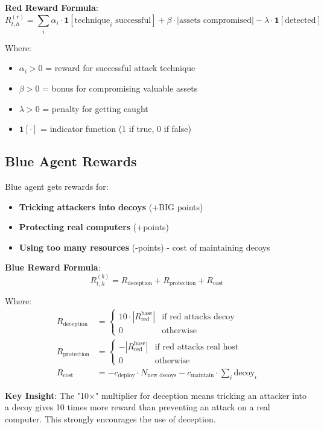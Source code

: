 \documentclass[11pt]{article}
\begin{document}
\begin{mathdetails}
\textbf{Red Reward Formula}:
$$R^{(r)}_{t,h} = \sum_i \alpha_i \cdot \mathbf{1}[\text{technique}_i \text{ successful}] + \beta \cdot |\text{assets compromised}| - \lambda \cdot \mathbf{1}[\text{detected}]$$

Where:
\begin{itemize}
\item $\alpha_i > 0$ = reward for successful attack technique
\item $\beta > 0$ = bonus for compromising valuable assets
\item $\lambda > 0$ = penalty for getting caught
\item $\mathbf{1}[\cdot]$ = indicator function (1 if true, 0 if false)
\end{itemize}
\end{mathdetails}

\subsection{Blue Agent Rewards}

\begin{intuition}
Blue agent gets rewards for:
\begin{itemize}
\item \textbf{Tricking attackers into decoys} (+BIG points)
\item \textbf{Protecting real computers} (+points)
\item \textbf{Using too many resources} (-points) - cost of maintaining decoys
\end{itemize}
\end{intuition}

\begin{mathdetails}
\textbf{Blue Reward Formula}:
$$R^{(b)}_{t,h} = R_{\text{deception}} + R_{\text{protection}} + R_{\text{cost}}$$

Where:
\begin{align}
R_{\text{deception}} &= \begin{cases}
10 \cdot |R_{\text{red}}^{\text{base}}| & \text{if red attacks decoy} \\
0 & \text{otherwise}
\end{cases} \\
R_{\text{protection}} &= \begin{cases}
-|R_{\text{red}}^{\text{base}}| & \text{if red attacks real host} \\
0 & \text{otherwise}
\end{cases} \\
R_{\text{cost}} &= -c_{\text{deploy}} \cdot N_{\text{new decoys}} - c_{\text{maintain}} \cdot \sum_i \text{decoy}_i
\end{align}

\textbf{Key Insight}: The "10×" multiplier for deception means tricking an attacker into a decoy gives 10 times more reward than preventing an attack on a real computer. This strongly encourages the use of deception.
\end{mathdetails}
\end{document}
